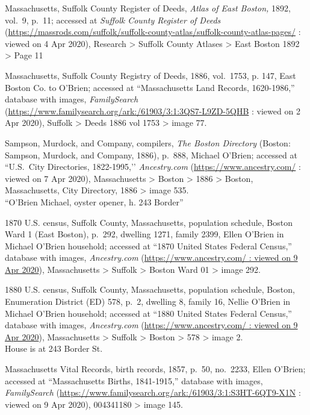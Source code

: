 \begin{thebibliography}{999}
	Massachusetts, Suffolk County Register of Deeds, \textit{Atlas of East Boston,} 1892, vol.\ 9, p.\ 11; accessed at \textit{Suffolk County Register of Deeds} (\url{https://massrods.com/suffolk/suffolk-county-atlas/suffolk-county-atlas-pages/} : viewed on 4 Apr 2020), Research > Suffolk County Atlases > East Boston 1892 > Page 11
	
	Massachusetts, Suffolk County Registry of Deeds, 1886, vol.\ 1753, p. 147, East Boston Co. to O’Brien; accessed at ``Massachusetts Land Records, 1620-1986,'' database with images, \textit{FamilySearch} (\url{https://www.familysearch.org/ark:/61903/3:1:3QS7-L9ZD-5QHB} : viewed on 2 Apr 2020), Suffolk > Deeds 1886 vol 1753 > image 77.
	
	Sampson, Murdock, and Company, compilers, \textit{The Boston Directory} (Boston: Sampson, Murdock, and Company, 1886), p.\ 888, Michael O'Brien; accessed at ``U.S.\ City Directories, 1822-1995,’’ \textit{Ancestry.com} (\url{https://www.ancestry.com/} : viewed on 7 Apr 2020), Massachusetts > Boston > 1886 > Boston, Massachusetts, City Directory, 1886 > image 535.\\
	``O'Brien Michael, oyster opener, h. 243 Border''
	
	1870 U.S. census, Suffolk County, Massachusetts, population schedule, Boston Ward 1 (East Boston), p.\ 292, dwelling 1271, family 2399, Ellen O'Brien in Michael O'Brien household; accessed at ``1870 United States Federal Census,'' database with images, \textit{Ancestry.com} (\url{https://www.ancestry.com/ : viewed on 9 Apr 2020}), Massachusetts > Suffolk > Boston Ward 01 > image 292.
	
	1880 U.S. census, Suffolk County, Massachusetts, population schedule, Boston, Enumeration District (ED) 578, p.\ 2, dwelling 8, family 16, Nellie O'Brien in Michael O'Brien household; accessed at ``1880 United States Federal Census,'' database with images, \textit{Ancestry.com} (\url{https://www.ancestry.com/ : viewed on 9 Apr 2020}), Massachusetts > Suffolk > Boston > 578 > image 2.\\
	House is at 243 Border St.
	
	Massachusetts Vital Records, birth records, 1857, p.\ 50, no.\ 2233, Ellen O'Brien; accessed at ``Massachusetts Births, 1841-1915,'' database with images, \textit{FamilySearch} (\url{https://www.familysearch.org/ark:/61903/3:1:S3HT-6QT9-X1N} : viewed on 9 Apr 2020), 004341180 > image 145.
	

\end{thebibliography}
